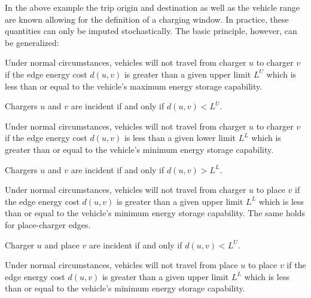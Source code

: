 In the above example the trip origin and destination as well as the vehicle range are known allowing for the definition of a charging window. In practice, these quantities can only be imputed stochastically. The basic principle, however, can be generalized:

\begin{lemma}
	Under normal circumstances, vehicles will not travel from charger $u$ to charger $v$ if the edge energy cost $d(u, v)$ is greater than a given upper limit $L^U$ which is less than or equal to the vehicle's maximum energy storage capability.
\end{lemma}

\begin{corollary}
	Chargers $u$ and $v$ are incident if and only if $d(u, v) < L^U$.
\end{corollary}

\begin{lemma}
	Under normal circumstances, vehicles will not travel from charger $u$ to charger $v$ if the edge energy cost $d(u, v)$ is less than a given lower limit $L^L$ which is greater than or equal to the vehicle's minimum energy storage capability.
\end{lemma}

\begin{corollary}
	Chargers $u$ and $v$ are incident if and only if $d(u, v) > L^L$.
\end{corollary}

\begin{lemma}
	Under normal circumstances, vehicles will not travel from charger $u$ to place $v$ if the edge energy cost $d(u, v)$ is greater than a given upper limit $L^L$ which is less than or equal to the vehicle's minimum energy storage capability. The same holds for place-charger edges.
\end{lemma}

\begin{corollary}
	Charger $u$ and place $v$ are incident if and only if $d(u, v) < L^U$.
\end{corollary}

\begin{lemma}
	Under normal circumstances, vehicles will not travel from place $u$ to place $v$ if the edge energy cost $d(u, v)$ is greater than a given upper limit $L^L$ which is less than or equal to the vehicle's minimum energy storage capability.
\end{lemma}

